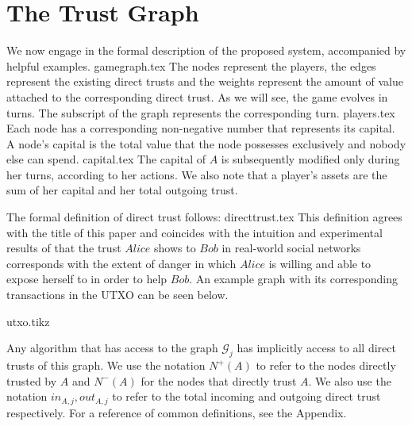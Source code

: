 \section{The Trust Graph}
   We now engage in the formal description of the proposed system, accompanied by helpful examples.
   {gamegraph.tex}
   The nodes represent the players, the edges represent the existing direct trusts and the weights represent the amount of
   value attached to the corresponding direct trust. As we will see, the game evolves in turns. The subscript of the graph
   represents the corresponding turn.
   {players.tex}
   Each node has a corresponding non-negative number that represents its capital. A node's capital is the total value that
   the node possesses exclusively and nobody else can spend.
   {capital.tex}
   The capital of $A$ is subsequently modified only during her turns, according to her actions. We also note that a
   player's assets are the sum of her capital and her total outgoing trust.

   The formal definition of direct trust follows:
   {directtrust.tex}
   This definition agrees with the title of this paper and coincides with the intuition and experimental results of
   \cite{kmrs} that the trust $Alice$ shows to $Bob$ in real-world social networks corresponds with the extent
   of danger in which $Alice$ is willing and able to expose herself to in order to help $Bob$. An example graph with its
   corresponding transactions in the UTXO can be seen below.

   {utxo.tikz}

   Any algorithm that has access to the graph $\mathcal{G}_j$ has implicitly access to all direct trusts of this graph.
   We use the notation $N^{+}(A)$ to refer to the nodes directly trusted by $A$ and $N^{-}(A)$ for the nodes that directly
   trust $A$. We also use the notation $in_{A, j}, out_{A, j}$ to refer to the total incoming and outgoing direct trust
   respectively. For a reference of common definitions, see the Appendix.
